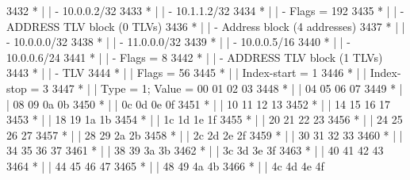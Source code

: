 \begin{DoxyCode}
3432 \textcolor{comment}{         * |    |     - 10.0.0.2/32}
3433 \textcolor{comment}{         * |    |     - 10.1.1.2/32}
3434 \textcolor{comment}{         * |    |     - Flags = 192}
3435 \textcolor{comment}{         * |    | - ADDRESS TLV block (0 TLVs)}
3436 \textcolor{comment}{         * |    | - Address block (4 addresses)}
3437 \textcolor{comment}{         * |    |     - 10.0.0.0/32}
3438 \textcolor{comment}{         * |    |     - 11.0.0.0/32}
3439 \textcolor{comment}{         * |    |     - 10.0.0.5/16}
3440 \textcolor{comment}{         * |    |     - 10.0.0.6/24}
3441 \textcolor{comment}{         * |    |     - Flags = 8}
3442 \textcolor{comment}{         * |    | - ADDRESS TLV block (1 TLVs)}
3443 \textcolor{comment}{         * |    |     - TLV}
3444 \textcolor{comment}{         * |    |         Flags = 56}
3445 \textcolor{comment}{         * |    |         Index-start = 1}
3446 \textcolor{comment}{         * |    |         Index-stop = 3}
3447 \textcolor{comment}{         * |    |         Type = 1; Value = 00  01  02  03}
3448 \textcolor{comment}{         * |    |                           04  05  06  07}
3449 \textcolor{comment}{         * |    |                           08  09  0a  0b}
3450 \textcolor{comment}{         * |    |                           0c  0d  0e  0f}
3451 \textcolor{comment}{         * |    |                           10  11  12  13}
3452 \textcolor{comment}{         * |    |                           14  15  16  17}
3453 \textcolor{comment}{         * |    |                           18  19  1a  1b}
3454 \textcolor{comment}{         * |    |                           1c  1d  1e  1f}
3455 \textcolor{comment}{         * |    |                           20  21  22  23}
3456 \textcolor{comment}{         * |    |                           24  25  26  27}
3457 \textcolor{comment}{         * |    |                           28  29  2a  2b}
3458 \textcolor{comment}{         * |    |                           2c  2d  2e  2f}
3459 \textcolor{comment}{         * |    |                           30  31  32  33}
3460 \textcolor{comment}{         * |    |                           34  35  36  37}
3461 \textcolor{comment}{         * |    |                           38  39  3a  3b}
3462 \textcolor{comment}{         * |    |                           3c  3d  3e  3f}
3463 \textcolor{comment}{         * |    |                           40  41  42  43}
3464 \textcolor{comment}{         * |    |                           44  45  46  47}
3465 \textcolor{comment}{         * |    |                           48  49  4a  4b}
3466 \textcolor{comment}{         * |    |                           4c  4d  4e  4f}

\end{DoxyCode}
